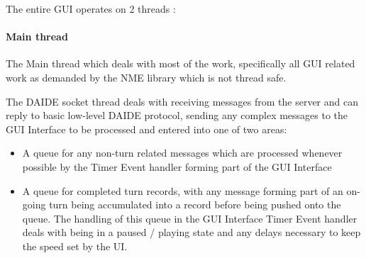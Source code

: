 The entire GUI operates on 2 threads :

\paragraph{Main thread}
The Main thread which deals with most of the work, specifically all
GUI related work as demanded by the NME library which is not thread
safe.

The DAIDE socket thread deals with receiving messages from the server
and can reply to basic low-level DAIDE protocol, sending any complex
messages to the GUI Interface to be processed and entered into one of
two areas:

\begin{itemize}

\item A queue for any non-turn related messages which are processed
      whenever possible by the Timer Event handler forming part of
      the GUI Interface
\item A queue for completed turn records, with any message forming
      part of an on-going turn being accumulated into a record before
      being pushed onto the queue. The handling of this queue in the
      GUI Interface Timer Event handler deals with being in a paused /
      playing state and any delays necessary to keep the speed set by 
      the UI.

\end{itemize}


